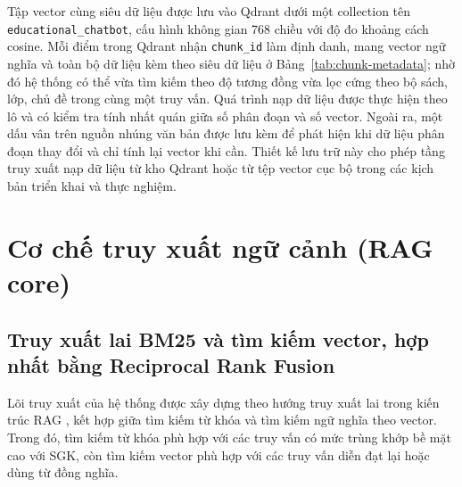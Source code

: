 \documentclass[../DoAn.tex]{subfiles}
\begin{document}
Tập vector cùng siêu dữ liệu được lưu vào Qdrant dưới một collection tên \texttt{educational\_chatbot}, cấu hình không gian 768 chiều với độ đo khoảng cách cosine. Mỗi điểm trong Qdrant nhận \texttt{chunk\_id} làm định danh, mang vector ngữ nghĩa và toàn bộ dữ liệu kèm theo siêu dữ liệu ở Bảng~\ref{tab:chunk-metadata}; nhờ đó hệ thống có thể vừa tìm kiếm theo độ tương đồng vừa lọc cứng theo bộ sách, lớp, chủ đề trong cùng một truy vấn. Quá trình nạp dữ liệu được thực hiện theo lô và có kiểm tra tính nhất quán giữa số phân đoạn và số vector. Ngoài ra, một dấu vân trên nguồn nhúng văn bản được lưu kèm để phát hiện khi dữ liệu phân đoạn thay đổi và chỉ tính lại vector khi cần. Thiết kế lưu trữ này cho phép tầng truy xuất nạp dữ liệu từ kho Qdrant hoặc từ tệp vector cục bộ trong các kịch bản triển khai và thực nghiệm.

\section{Cơ chế truy xuất ngữ cảnh (RAG core)}

\subsection{Truy xuất lai BM25 và tìm kiếm vector, hợp nhất bằng Reciprocal Rank Fusion}

Lõi truy xuất của hệ thống được xây dựng theo hướng truy xuất lai trong kiến trúc RAG \cite{lewis2020rag}, kết hợp giữa tìm kiếm từ khóa và tìm kiếm ngữ nghĩa theo vector. Trong đó, tìm kiếm từ khóa phù hợp với các truy vấn có mức trùng khớp bề mặt cao với SGK, còn tìm kiếm vector phù hợp với các truy vấn diễn đạt lại hoặc dùng từ đồng nghĩa.
\end{document}
